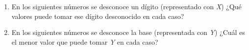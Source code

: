 \documentclass[12pt]{article}
\begin{document}
\begin{enumerate}[resume]

    \item En los siguientes números se desconoce un dígito (representado con
        \emph{X}) ¿Qué valores puede tomar ese dígito desconocido en cada caso?


    \item En los siguientes números se desconoce la base (representada con
        \emph{Y}) ¿Cuál es el menor valor que puede tomar \emph{Y} en cada
        caso?


\end{enumerate}
\end{document}
